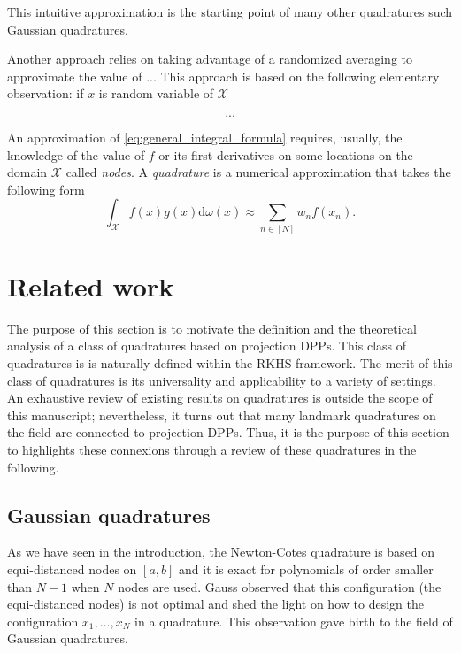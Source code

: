 \documentclass[twoside,11pt]{book}
\begin{document}
 


This intuitive approximation is the starting point of many other quadratures such Gaussian quadratures. 

Another approach relies on taking advantage of a randomized averaging to approximate the value of ... This approach is based on the following elementary observation: if $x$ is random variable of $\mathcal{X}$ 

\begin{equation}
...
\end{equation} 



An approximation of \eqref{eq:general_integral_formula} requires, usually, the knowledge of the value of $f$ or its first derivatives on some locations on the domain $\mathcal{X}$ called \emph{nodes}. A \emph{quadrature} is a numerical approximation that takes the following form
\begin{equation}
\int_{\mathcal{X}}f(x)g(x)\mathrm{d}\omega(x)   \approx \sum\limits_{n \in [N]}w_{n}f(x_{n}).
\end{equation}


\section{Related work}
The purpose of this section is to motivate the definition and the theoretical analysis of a class of quadratures based on projection DPPs. This class of quadratures is is naturally defined within the RKHS framework. The merit of this class of quadratures is its universality and applicability to a variety of settings. An exhaustive review of existing results on quadratures is outside the scope of this manuscript; nevertheless, it turns out that many landmark quadratures on the field are connected to projection DPPs. 
Thus, it is the purpose of this section to highlights these connexions through a review of these quadratures in the following.







\subsection{Gaussian quadratures}
As we have seen in the introduction, the Newton-Cotes quadrature is based on equi-distanced nodes on $[a,b]$ and it is exact for polynomials of order smaller than $N-1$ when $N$ nodes are used. Gauss observed that this configuration (the equi-distanced nodes) is not optimal and shed the light on how to design the configuration $x_{1}, \dots, x_{N}$ in a quadrature. This observation gave birth to the field of Gaussian quadratures.
\end{document}
